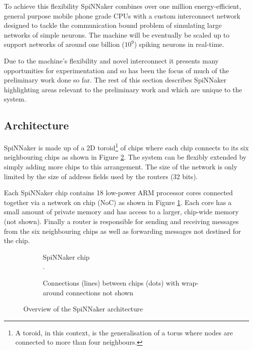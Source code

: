 		To achieve this flexibility SpiNNaker combines over one million
		energy-efficient, general purpose mobile phone grade CPUs with a custom
		interconnect network designed to tackle the communication bound problem of
		simulating large networks of simple neurons. The machine will be eventually
		be scaled up to support networks of around one billion ($10^9$) spiking
		neurons in real-time.
		
		Due to the machine's flexibility and novel interconnect it presents many
		opportunities for experimentation and so has been the focus of much of the
		preliminary work done so far. The rest of this section describes SpiNNaker
		highlighting areas relevant to the preliminary work and which are unique to
		the system.
		
		\subsection{Architecture}
			
			
			SpiNNaker is made up of a 2D toroid\footnote{A toroid, in this context, is
			the generalisation of a torus where nodes are connected to more than four
			neighbours.} of chips where each chip connects to its six neighbouring
			chips as shown in Figure \ref{fig:spinnaker-chips}. The system can be
			flexibly extended by simply adding more chips to this arrangement. The
			size of the network is only limited by the size of address fields used by
			the routers (32 bits).
			
			Each SpiNNaker chip contains 18 low-power ARM processor cores connected
			together via a network on chip (NoC) as shown in Figure
			\ref{fig:spinnaker-chip}. Each core has a small amount of private memory
			and has access to a larger, chip-wide memory (not shown). Finally a router
			is responsible for sending and receiving messages from the six
			neighbouring chips as well as forwarding messages not destined for the
			chip.
			
			\begin{figure}
				\center
				\begin{subfigure}[b]{0.49\textwidth}
					\center
					
					\caption{SpiNNaker chip\\\color{white}.}
					\label{fig:spinnaker-chip}
				\end{subfigure}
				\begin{subfigure}[b]{0.49\textwidth}
					\center
					
					\caption{Connections (lines) between chips (dots) with wrap-around
					connections not shown}
					\label{fig:spinnaker-chips}
				\end{subfigure}
				
				\caption{Overview of the SpiNNaker architecture}
				\label{fig:spinnaker-architecture}
			\end{figure}
		
